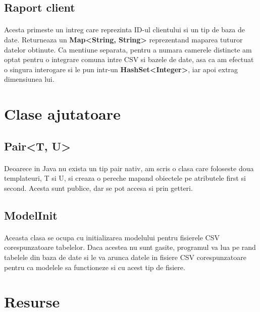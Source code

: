 \documentclass[oneside]{article}
\begin{document}
\subsection[Raport client]{Raport client}
\paragraph{} Acesta primeste un intreg care reprezinta ID-ul clientului si un tip de baza de date. Returneaza un \textbf{Map<String, String>} reprezentand maparea tuturor datelor obtinute. Ca mentiune separata, pentru a numara camerele distincte am optat pentru o integrare comuna intre CSV si bazele de date, asa ca am efectuat o singura interogare si le pun intr-un \textbf{HashSet<Integer>}, iar apoi extrag dimensiunea lui.

\section[Clase ajutatoare]{Clase ajutatoare}
\subsection[Pair<T, U>]{Pair<T, U>}
\paragraph{} Deoarece in Java nu exista un tip pair nativ, am scris o clasa care foloseste doua templateuri, T si U, si creaza o pereche mapand obiectele pe atributele first si second. Acesta sunt publice, dar se pot accesa si prin getteri.

\subsection[ModelInit]{ModelInit}
\paragraph{} Aceasta clasa se ocupa cu initializarea modelului pentru fisierele CSV corespunzatoare tabelelor. Daca acestea nu sunt gasite, programul va lua pe rand tabelele din baza de date si le va arunca datele in fisiere CSV corespunzatoare pentru ca modelele sa functioneze si cu acest tip de fisiere.

\section[Resurse]{Resurse}
\end{document}

